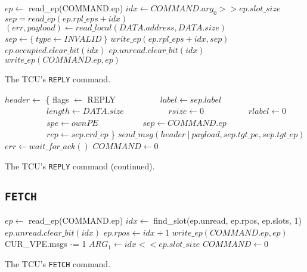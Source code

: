 \begin{algorithm}
    $ep \gets$ read\_ep(COMMAND.ep)\;
    \extend{}
    \BlankLine
    $idx \gets COMMAND.arg_0 >> ep.slot\_size$\;
    $sep = read\_ep(ep.rpl\_eps + idx)$\;
    \BlankLine
    $(err, payload) \gets read\_local(DATA.address, DATA.size)$\;
    \extend{}
    \BlankLine
    $sep \gets \{~type \gets INVALID~\}$\;
    $write\_ep(ep.rpl\_eps + idx, sep)$\;
    \BlankLine
    \extend{}
    \BlankLine
    $ep.occupied.clear\_bit(idx)$\;
    $ep.unread.clear\_bit(idx)$\;
    $write\_ep(COMMAND.ep, ep)$\;
    \caption{The TCU's \texttt{REPLY} command.}
\end{algorithm}

\begin{algorithm}
    \setcounter{AlgoLine}{29}
    $header \gets$ \{ flags $\gets$ REPLY\;
    $\quad\quad\quad\quad\quad label \gets sep.label$\;
    $\quad\quad\quad\quad\quad length \gets DATA.size$\;
    $\quad\quad\quad\quad\quad rsize \gets 0$\;
    $\quad\quad\quad\quad\quad rlabel \gets 0$\;
    $\quad\quad\quad\quad\quad spe \gets ownPE$\;
    $\quad\quad\quad\quad\quad sep \gets COMMAND.ep$\;
    $\quad\quad\quad\quad\quad rep \gets sep.crd\_ep$ \}\;
    $send\_msg(header\ |\ payload, sep.tgt\_pe, sep.tgt\_ep)$\;
    $err \gets wait\_for\_ack()$\;
    \BlankLine
    $COMMAND \gets 0$\;
    \caption{The TCU's \texttt{REPLY} command (continued).}
\end{algorithm}

\subsection{\texttt{FETCH}}

\begin{algorithm}[H]
    $ep \gets$ read\_ep(COMMAND.ep)\;
    \extend{}
    \BlankLine
    $idx \gets$ find\_slot(ep.unread, ep.rpos, ep.slots, 1)\;
    $ep.unread.clear\_bit(idx)$\;
    $ep.rpos \gets idx + 1$\;
    $write\_ep(COMMAND.ep, ep)$\;
    \BlankLine
    CUR\_VPE.msgs -= 1\;
    \extend{}
    \BlankLine
    $ARG_1 \gets idx << ep.slot\_size$\;
    $COMMAND \gets 0$\;
    \caption{The TCU's \texttt{FETCH} command.}
\end{algorithm}

